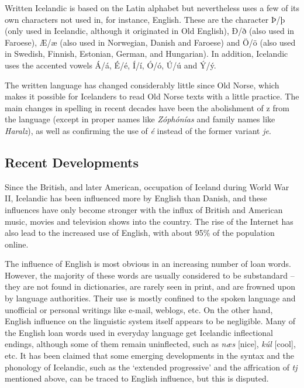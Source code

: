 \documentclass{../../metanetpaper}
\begin{document}
\begin{multicols}{2}
Written Icelandic is based on the Latin alphabet but nevertheless uses a few of its own characters not used in, for instance, English. These are the character Þ/þ (only used in Icelandic, although it originated in Old English), Ð/ð (also used in Faroese), Æ/æ (also used in Norwegian, Danish and Faroese) and Ö/ö (also used in Swedish, Finnish, Estonian, German, and Hungarian). In addition, Icelandic uses the accented vowels Á/á, É/é, Í/í, Ó/ó, Ú/ú and Ý/ý.

The written language has changed considerably little since Old Norse, which makes it possible for Icelanders to read Old Norse texts with a little practice. The main changes in spelling in recent decades have been the abolishment of z from the language (except in proper names like \textit{Zóphónías} and family names like \textit{Haralz}), as well as confirming the use of \textit{é} instead of the former variant \textit{je}.

\subsection{Recent Developments}

Since the British, and later American, occupation of Iceland during World War II, Icelandic has been influenced more by English than Danish, and these influences have only become stronger with the influx of British and American music, movies and television shows into the country. The rise of the Internet has also lead to the increased use of English, with about 95\% of the population online.

The influence of English is most obvious in an increasing number of loan words. However, the majority of these words are usually considered to be substandard -- they are not found in dictionaries, are rarely seen in print, and are frowned upon by language authorities. Their use is mostly confined to the spoken language and unofficial or personal writings like e-mail, weblogs, etc.
On the other hand, English influence on the linguistic system itself appears to be negligible. Many of the English loan words used in everyday language get Icelandic inflectional endings, although some of them remain uninflected, such as \textit{næs} {[}nice{]}, \textit{kúl} {[}cool{]}, etc. It has been claimed that some emerging developments in the syntax and the phonology of Icelandic, such as the ‘extended progressive’ and the affrication of \textit{tj} mentioned above, can be traced to English influence, but this is disputed.


\end{multicols}
\end{document}
